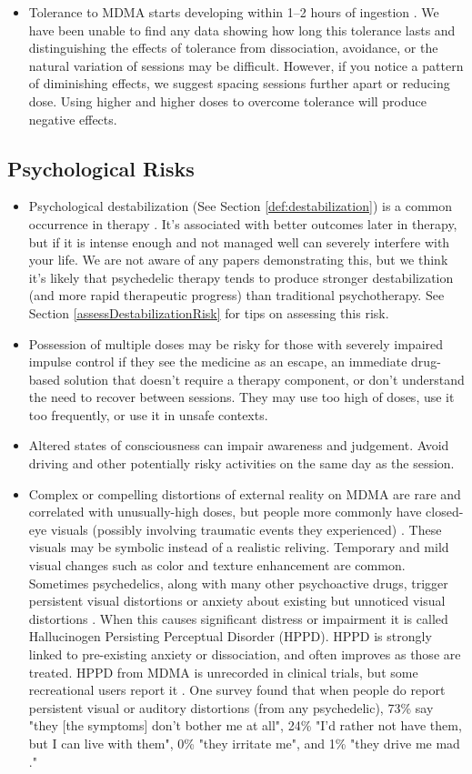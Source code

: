 \documentclass[12pt,letterpaper]{book}
\begin{document}
\begin{itemize}
    \item Tolerance to MDMA starts developing within 1–2 hours of ingestion \cite{farreTolerance,parrottTolerance}. We have been unable to find any data showing how long this tolerance lasts and distinguishing the effects of tolerance from dissociation, avoidance, or the natural variation of sessions may be difficult. However, if you notice a pattern of diminishing effects, we suggest spacing sessions further apart or reducing dose. Using higher and higher doses to overcome tolerance will produce negative effects.
\end{itemize}
\subsection*{Psychological Risks}
\begin{itemize}
    \item Psychological destabilization (See Section \ref{def:destabilization}) is a common occurrence in therapy \cite{olthofDestabilization}. It's associated with better outcomes later in therapy, but if it is intense enough and not managed well can severely interfere with your life. We are not aware of any papers demonstrating this, but we think it's likely that psychedelic therapy tends to produce stronger destabilization (and more rapid therapeutic progress) than traditional psychotherapy. See Section \ref{assessDestabilizationRisk} for tips on assessing this risk.
    \item Possession of multiple doses may be risky for those with severely impaired impulse control if they see the medicine as an escape, an immediate drug-based solution that doesn't require a therapy component, or don't understand the need to recover between sessions. They may use too high of doses, use it too frequently, or use it in unsafe contexts.
    \item Altered states of consciousness can impair awareness and judgement. Avoid driving and other potentially risky activities on the same day as the session.
    \item Complex or compelling distortions of external reality on MDMA are rare and correlated with unusually-high doses, but people more commonly have closed-eye visuals (possibly involving traumatic events they experienced) \cite{liechtiGender}. These visuals may be symbolic instead of a realistic reliving. Temporary and mild visual changes such as color and texture enhancement are common. Sometimes psychedelics, along with many other psychoactive drugs, trigger persistent visual distortions or anxiety about existing but unnoticed visual distortions \cite{alexanderHPPD,halpernHPPD}. When this causes significant distress or impairment it is called Hallucinogen Persisting Perceptual Disorder (HPPD). HPPD is strongly linked to pre-existing anxiety or dissociation, and often improves as those are treated. HPPD from MDMA is unrecorded in clinical trials, but some recreational users report it \cite{vizeliActuteEffects,litjensHPPD}. One survey found that when people do report persistent visual or auditory distortions (from any psychedelic), 73\% say "they [the symptoms] don't bother me at all", 24\% "I'd rather not have them, but I can live with them", 0\% "they irritate me", and 1\% "they drive me mad \cite{carhart2010user}."

\end{itemize}
\end{document}
